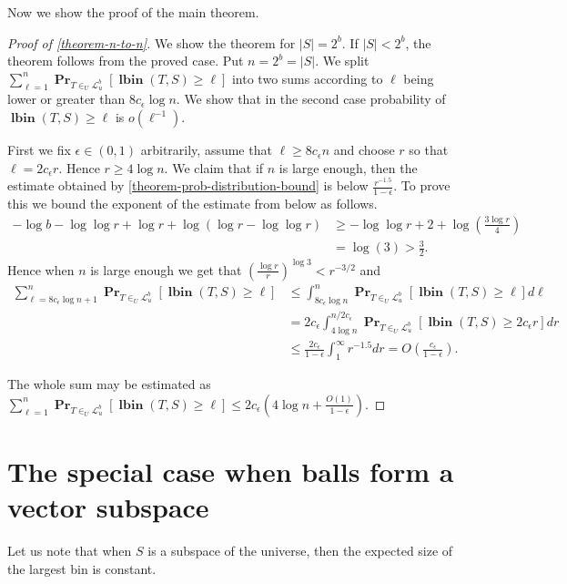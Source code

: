 \documentclass[unicode,review]{siamart1116}
\newcommand{\lbin}[2]{\operatorname{\mathbf{lbin}}({#1}, {#2})}
\newcommand{\linearmaps}[2]{\mathcal{L}_{#1}^{#2}}
\newcommand{\probs}[2]{\operatorname{\mathbf{Pr}}_{{#1}}\left[{#2}\right]}
\numberwithin{theorem}{section}
\begin{document}
Now we show the proof of the main theorem.

\begin{proof}[Proof of \cref{theorem-n-to-n}]
We show the theorem for $|S| = 2^b$.
If $|S| < 2^b$, the theorem follows from the proved case.
Put $n = 2^b = |S|$.
We split $\sum_{\ell = 1}^{n} \probs{T\in_U\linearmaps{u}{b}}{\lbin{T}{S} \geq \ell}$ into two sums according to $\ell$ being lower or greater than $8c_\epsilon \log n$.
We show that in the second case probability of $\lbin{T}{S} \geq \ell$ is $o(\ell^{-1})$.

First we fix $\epsilon \in (0, 1)$ arbitrarily, assume that $\ell \geq 8c_\epsilon n$ and choose $r$ so that $\ell = 2 c_\epsilon r$.
Hence $r \geq 4\log n$.
We claim that if $n$ is large enough, then the estimate obtained by \cref{theorem-prob-distribution-bound} is below $\frac{r^{-1.5}}{1-\epsilon}$.
To prove this we bound the exponent of the estimate from below as follows.
\begin{align*}
-\log b - \log \log r + \log r + \log (\log r - \log \log r) 
	& \geq -\log \log r + 2 + \log \left(\frac{3\log r}{4}\right) \\
	& = \log(3) > \frac{3}{2}.
\end{align*}
Hence when $n$ is large enough we get that $\left(\frac{\log r}{r}\right)^{\log 3} < r^{-3/2}$ and
\begin{align*}
\sum_{\ell = 8c_\epsilon \log n + 1}^{n} \probs{T\in_U\linearmaps{u}{b}}{\lbin{T}{S} \geq \ell} 
	& \leq \int_{8c_\epsilon \log n}^{n} \probs{T\in_U\linearmaps{u}{b}}{\lbin{T}{S} \geq \ell} d\ell \\
	& = 2c_\epsilon \int_{4 \log n}^{n/2c_\epsilon} \probs{T\in_U\linearmaps{u}{b}}{\lbin{T}{S} \geq 2c_\epsilon r} dr \\
	& \leq \frac{2c_\epsilon}{1-\epsilon} \int_{1}^{\infty} r^{-1.5} dr = O\left(\frac{c_\epsilon}{1-\epsilon}\right).
\end{align*}

The whole sum may be estimated as $
\sum_{\ell = 1}^{n} \probs{T\in_U\linearmaps{u}{b}}{\lbin{T}{S} \geq \ell} \leq 2c_\epsilon \left(4 \log n + \frac{O(1)}{1-\epsilon}\right).$
\end{proof}

\section{The special case when balls form a vector subspace}

Let us note that when $S$ is a subspace of the universe, then the expected size of the largest bin is constant.
\end{document}
